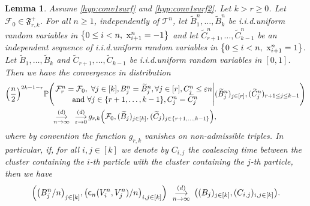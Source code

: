 \documentclass[11pt]{article}
\theoremstyle{plain}
\newtheorem{lemma}[theorem]{Lemma}
\theoremstyle{definition}
\theoremstyle{remark}
\renewcommand{\P}{{\mathbb{P}}} %
\newcommand{\1}{\mathbbm{1}} %
\newcommand{\proba}[1]{\mathbb{P}\left(#1\right)} %
\newcommand{\e}{\varepsilon} %
\newcommand{\T}{\mathcal{T}} %
\newcommand{\coal}{\mathsf{c}} %
\newcommand{\X}{\mathrm x} %
\newcommand{\cvloi}[1][n]{\enskip\mathop{\longrightarrow}^{(d)}_{#1 \to \infty}\enskip}
\let\originalleft\left
\let\originalright\right
\renewcommand{\left}{\mathopen{}\mathclose\bgroup\originalleft}
\renewcommand{\right}{\aftergroup\egroup\originalright}
\begin{document}
\begin{lemma}
Assume \ref{hyp:conv1surf} and \ref{hyp:conv1surf2}. Let $k>r\ge 0$. Let $\mathcal{F}_0 \in \mathfrak{F}^+_{r,k}$. 
For all $n\ge 1$, independently of $\T^n$, let $\widetilde{B}_1^n,\ldots,\widetilde{B}_k^n$ be i.i.d.\@ uniform random variables in $\left\{0\le i <n , \ \X^n_{i+1}=-1\right\}$ and let $\widetilde{C}_{r+1}^n,\ldots,\widetilde{C}_{k-1}^n$ be an independent sequence of i.i.d.\@ uniform random variables in $\left\{0\le i <n, \ \X^n_{i+1}=1\right\}$.  Let $\widetilde{B}_1, \ldots , \widetilde{B}_k $ and $\widetilde{C}_{r+1},\ldots,  \widetilde{C}_{k-1}$ be i.i.d.\@ uniform random variables in $[0,1]$. Then we have the convergence in distribution
\begin{align}
\left(\frac{n }{2}\right)^{2k-1-r}\P&\left( \left. 
\begin{matrix}
	\mathcal{F}^n_r=\mathcal{F}_0, \  \forall j \in [k],  B^n_j=\widetilde{B}_j^n, \forall j \in [r], C^n_j\le \e n  \\
	\text{ and } \forall j \in \{r+1,\ldots,k-1\},  C^n_j=\widetilde{C}_j^n  
\end{matrix}
\right\vert (\widetilde{B}^n_j)_{j \in [r]}, (\widetilde{C}^n_j)_{r+1 \le j \le k-1} \right) \notag\\
&\cvloi[n]\mathop{\longrightarrow}\limits_{\e \to 0}^{(d)}
 g_{r,k}\left(\mathcal{F}_0, (\widetilde{B}_j)_{j\in [k]}, (\widetilde{C}_j)_{j \in \{r+1,\ldots, k-1 \}}\right),\label{eq:cv locale}
\end{align}
where by convention the function $g_{r,k}$ vanishes on non-admissible triples. In particular, if, for all $i,j\in [k]$ we denote by $C_{i,j}$ the coalescing time between the cluster containing the $i$-th particle with the cluster containing the $j$-th particle, then we have
\begin{equation}
\label{cv coalescent}
\left(\left({B_j^n}/{n}\right)_{j \in [k]}, \left({\coal_n(V^n_i,V^n_j)}/{n}\right)_{i,j \in [k]}\right) \cvloi[n]  \left( (B_j)_{j \in [k]}, (C_{i,j})_{i,j \in [k]}\right) .
\end{equation}
\end{lemma}
\end{document}
